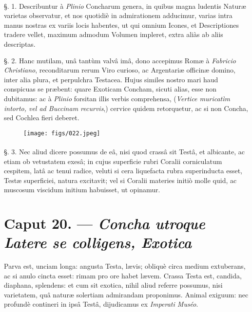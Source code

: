 \documentclass[a4paper, 11pt, oneside, polutonikogreek, german]{article}
\begin{document}
\paragraph{}
§. 1. Describuntur à \emph{Plinio} Concharum genera, in quibus magna ludentis Naturæ varietas observatur, et nos quotidiè in admirationem adducimur, varias intra manus nostras ex variis locis habentes, ut qui omnium Icones, et Descriptiones tradere vellet, maximum admodum Volumen impleret, extra aliàs ab aliis descriptas.

§. 2. Hanc mutilam, unâ tantùm valvâ imâ, dono accepimus Romæ à \emph{Fabricio Christiano}, reconditarum rerum Viro curioso, ac Argentariæ officinæ domino, inter alia plura, et perpulchra Testacea. Hujus similes nostro mari haud conspicuas se præbent: quare Exoticam Concham, sicuti alias, esse non dubitamus: ac à \emph{Plinio} forsitan illis verbis comprehensa, (\emph{Vertice muricatìm intorto, vel ad Buccinam recurvis},) cervice quidem retorquetur, ac si non Concha, sed Cochlea fieri deberet.

\begin{figure}[H]
\centering
\texttt{[image: figs/022.jpeg]}

\end{figure}
\paragraph{}
§. 3. Nec aliud dicere possumus de eâ, nisi quod crassâ sit Testâ, et albicante, ac etiam ob vetustatem exesâ; in cujus superficie rubri Coralii corniculatum cespitem, latâ ac tenui radice, veluti si cera liquefacta rubra superinducta esset, Testæ superficiei, natura excitavit; vel si Coralii materies initiò molle quid, ac muscosum viscidum initium habuisset, ut opinamur.

\section{Caput 20. --- \emph{Concha utroque Latere se colligens, Exotica}}
\paragraph{}
Parva est, unciam longa: angusta Testa, lævis; obliquè circa medium extuberans, ac si anulo cincta esset: rimam pro ore habet lævem. Crassa Testa est, candida, diaphana, splendens: et cum sit exotica, nihil aliud referre possumus, nisi varietatem, quâ naturæ solertiam admirandam proponimus. Animal exiguum: nec profundè contineri in ipsâ Testâ, dijudicamus ex \emph{Imperati Muséo}.
\end{document}
